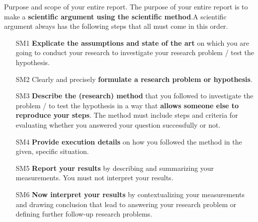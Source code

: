 \documentclass[
	a4paper,
	pagesize,
	pdftex,
	12pt,
	ngerman,
	fleqn,
	final,
	]{scrartcl}
\theoremstyle{definition}
\begin{document}

\mitverteidigung %
\makeTitel


\tableofcontents
\newpage

\textsf{Purpose and scope of your entire report.} The purpose of your entire report is to make a 
\textbf{scientific argument using the scientific method}.A scientific argument always has the following steps that all must come in this order.

\begin{itemize}
	\item[SM1] \textbf{Explicate the assumptions and state of the art} on which you are going to conduct your research to investigate your research problem / test the hypothesis.
	\item[SM2] Clearly and precisely \textbf{formulate a research problem or hypothesis}.
	\item[SM3] \textbf{Describe the (research) method} that you followed to investigate the problem / to test the hypothesis in a way that \textbf{allows someone else to reproduce your steps}. The method must include steps and criteria for evaluating whether you answered your question successfully or not.
	\item[SM4] \textbf{Provide execution details} on how you followed the method in the given, specific situation.
	\item[SM5] \textbf{Report your results} by describing and summarizing your measurements. You must not interpret your results.
	\item[SM6] \textbf{Now interpret your results} by contextualizing your measurements and drawing conclusion that lead to answering your research problem or defining further follow-up research problems.
	
\end{itemize}
\end{document}
